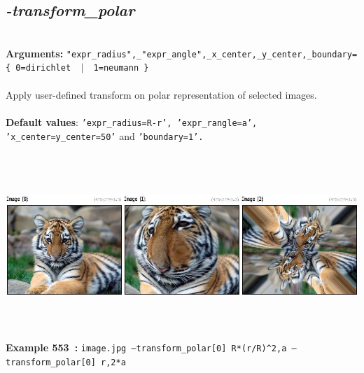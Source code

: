 \documentclass[a4paper,11pt,twoside]{book}
\begin{document}
\subsection{\emph{-transform\_polar} }\vspace*{-0.5em}
~\\\textbf{Arguments: } 
{\small \texttt{"expr\_radius",\_"expr\_angle",\_x\_center,\_y\_center,\_boundary=\{ 0=dirichlet ~$|$~ 1=neumann \}}}\\~\\
Apply user-defined transform on polar representation of selected images.
~\\~\\\textbf{Default values}: {\small \texttt{'expr\_radius=R-r', 'expr\_rangle=a', 'x\_center=y\_center=50'} and \texttt{'boundary=1'.}}
\begin{center}\includegraphics[keepaspectratio=true,height=7cm,width=\textwidth]{img/gmic_def553.jpg}\\
{\footnotesize \textbf{Example 553~:} \texttt{image.jpg --transform\_polar[0] R*(r/R)\textasciicircum 2,a --transform\_polar[0] r,2*a}}
\end{center}
\end{document}
